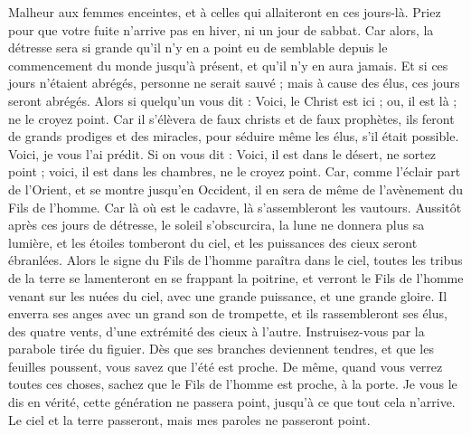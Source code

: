 \begin{multicols}{2}
Malheur aux femmes enceintes, et à celles qui allaiteront en ces jours-là.
Priez pour que votre fuite n’arrive pas en hiver, ni un jour de sabbat{}.
Car alors, la détresse sera si grande qu’il n’y en a point eu de semblable depuis le commencement du monde jusqu’à présent, et qu’il n’y en aura jamais.
Et si ces jours n’étaient abrégés, personne ne serait sauvé ; mais à cause des élus, ces jours seront abrégés.
Alors si quelqu'un vous dit : Voici, le Christ est ici ; ou, il est là ; ne le croyez point.
Car il s'élèvera de faux christs et de faux prophètes, ils feront de grands prodiges et des miracles, pour séduire même les élus, s'il était possible.
Voici, je vous l'ai prédit.
Si on vous dit : Voici, il est dans le désert, ne sortez point ; voici, il est dans les chambres, ne le croyez point.
Car, comme l'éclair part de l'Orient, et se montre jusqu'en Occident, il en sera de même de l'avènement du Fils de l'homme.
Car là où est le cadavre, là s'assembleront les vautours.
Aussitôt après ces jours de détresse, le soleil s’obscurcira, la lune ne donnera plus sa lumière, et les étoiles tomberont du ciel, et les puissances des cieux seront ébranlées.
Alors le signe du Fils de l'homme paraîtra dans le ciel, toutes les tribus de la terre se lamenteront en se frappant la poitrine, et verront le Fils de l'homme venant sur les nuées du ciel, avec une grande puissance, et une grande gloire.
Il enverra ses anges avec un grand son de trompette, et ils rassembleront ses élus, des quatre vents, d’une extrémité des cieux à l’autre.
Instruisez-vous par la parabole tirée du figuier. Dès que ses branches deviennent tendres, et que les feuilles poussent, vous savez que l'été est proche.
De même, quand vous verrez toutes ces choses, sachez que le Fils de l'homme est proche, à la porte.
Je vous le dis en vérité, cette génération ne passera point, jusqu’à ce que tout cela n’arrive.
Le ciel et la terre passeront, mais mes paroles ne passeront point.

\end{multicols}
